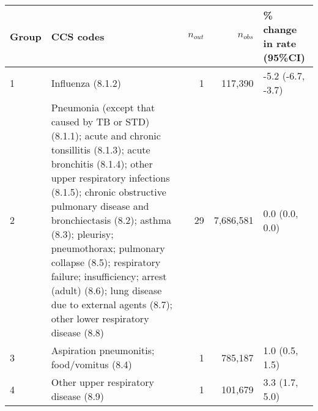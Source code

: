 \begin{tabular}{lp{6.5cm}rrp{2.2cm}}
  \hline
Group & CCS codes & $n_{out}$ & $n_{obs}$ & \% change in rate (95\%CI) \\ 
  \hline
 1 & Influenza (8.1.2) &  1 & 117,390 & -5.2 (-6.7, -3.7) \\ 
   2 & Pneumonia (except that caused by TB or STD) (8.1.1); acute and chronic tonsillitis (8.1.3); acute bronchitis (8.1.4); other upper respiratory infections (8.1.5); chronic obstructive pulmonary disease and bronchiectasis (8.2); asthma (8.3); pleurisy; pneumothorax; pulmonary collapse (8.5); respiratory failure; insufficiency; arrest (adult) (8.6); lung disease due to external agents (8.7); other lower respiratory disease (8.8) & 29 & 7,686,581 & 0.0 (0.0, 0.0) \\ 
   3 & Aspiration pneumonitis; food/vomitus (8.4) &  1 & 785,187 & 1.0 (0.5, 1.5) \\ 
   4 & Other upper respiratory disease (8.9) &  1 & 101,679 & 3.3 (1.7, 5.0) \\ 
   \hline
\end{tabular}

